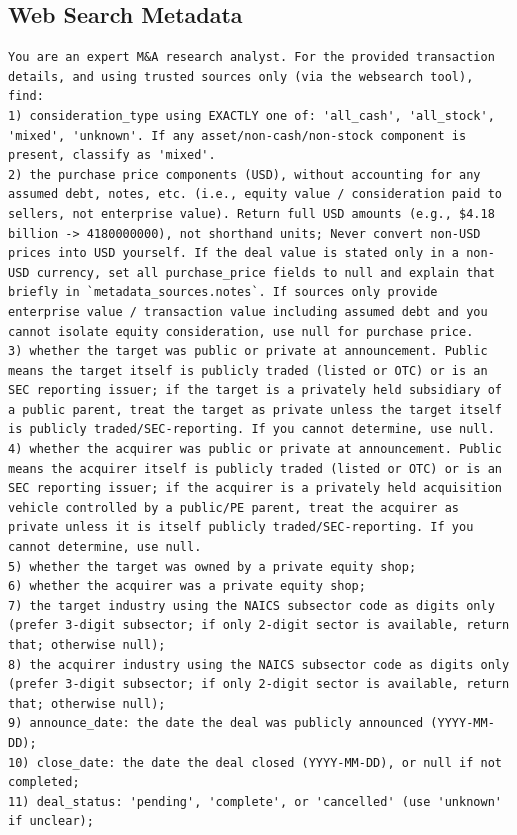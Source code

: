 \documentclass[12pt]{article}
\begin{document}
{\begin{appendices}
\subsection{Web Search Metadata}
\label{app:web-search-metadata-prompt}
\begingroup
\singlespacing
\begin{verbatim}
You are an expert M&A research analyst. For the provided transaction details, and using trusted sources only (via the websearch tool), find:
1) consideration_type using EXACTLY one of: 'all_cash', 'all_stock', 'mixed', 'unknown'. If any asset/non-cash/non-stock component is present, classify as 'mixed'.
2) the purchase price components (USD), without accounting for any assumed debt, notes, etc. (i.e., equity value / consideration paid to sellers, not enterprise value). Return full USD amounts (e.g., $4.18 billion -> 4180000000), not shorthand units; Never convert non-USD prices into USD yourself. If the deal value is stated only in a non-USD currency, set all purchase_price fields to null and explain that briefly in `metadata_sources.notes`. If sources only provide enterprise value / transaction value including assumed debt and you cannot isolate equity consideration, use null for purchase price.
3) whether the target was public or private at announcement. Public means the target itself is publicly traded (listed or OTC) or is an SEC reporting issuer; if the target is a privately held subsidiary of a public parent, treat the target as private unless the target itself is publicly traded/SEC-reporting. If you cannot determine, use null.
4) whether the acquirer was public or private at announcement. Public means the acquirer itself is publicly traded (listed or OTC) or is an SEC reporting issuer; if the acquirer is a privately held acquisition vehicle controlled by a public/PE parent, treat the acquirer as private unless it is itself publicly traded/SEC-reporting. If you cannot determine, use null.
5) whether the target was owned by a private equity shop;
6) whether the acquirer was a private equity shop;
7) the target industry using the NAICS subsector code as digits only (prefer 3-digit subsector; if only 2-digit sector is available, return that; otherwise null);
8) the acquirer industry using the NAICS subsector code as digits only (prefer 3-digit subsector; if only 2-digit sector is available, return that; otherwise null);
9) announce_date: the date the deal was publicly announced (YYYY-MM-DD);
10) close_date: the date the deal closed (YYYY-MM-DD), or null if not completed;
11) deal_status: 'pending', 'complete', or 'cancelled' (use 'unknown' if unclear);

\end{verbatim}
\end{appendices}}
\end{document}

